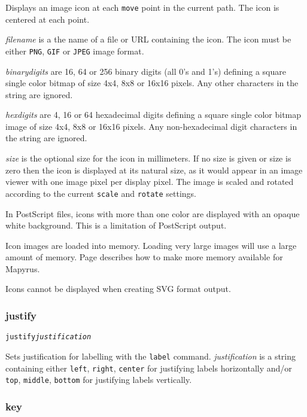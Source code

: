 Displays an image icon at each \texttt{move} point in
the current path.  The icon is centered at each point.

\textit{filename} is a the name of a file or URL containing the icon.
The icon must be either \texttt{PNG}, \texttt{GIF} or \texttt{JPEG}
image format.

\textit{binarydigits} are 16, 64 or 256 binary digits (all 0's and 1's)
defining a square single color bitmap of size 4x4, 8x8 or 16x16 pixels.
Any other characters in the string are ignored.

\textit{hexdigits} are 4, 16 or 64 hexadecimal digits defining
a square single color bitmap image of size 4x4, 8x8 or 16x16 pixels.
Any non-hexadecimal digit characters in the string are ignored.

\textit{size} is the optional size for the icon in millimeters.  If no size
is given or size is zero then the icon is displayed at its natural size,
as it would appear in an image viewer with one image pixel per display
pixel.
The image is scaled and rotated according to the current \texttt{scale}
and \texttt{rotate} settings.

In PostScript files, icons with more than one color
are displayed with an opaque white background.  This is a limitation
of PostScript output.

Icon images are loaded into memory.
Loading very large images will use a large amount of memory.
Page \pageref{morememory} describes how to make more memory available
for Mapyrus.

Icons cannot be displayed when creating SVG format output.

\subsubsection{justify}

\begin{alltt}
justify \textit{justification}
\end{alltt}

Sets justification for labelling with the \texttt{label} command.
\textit{justification} is a string containing either
\texttt{left}, \texttt{right}, \texttt{center} for justifying labels
horizontally and/or
\texttt{top}, \texttt{middle}, \texttt{bottom} for justifying labels
vertically.

\subsubsection{key}

